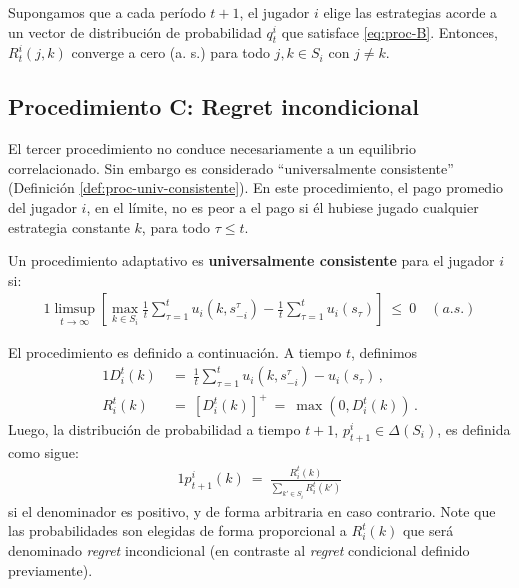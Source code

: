 \begin{theorem}
Supongamos que a cada período $t+1$, el jugador $i$ elige las estrategias acorde a un vector de distribución de probabilidad $q_t^i$ que satisface \eqref{eq:proc-B}. Entonces, $R^i_t(j, k)$ converge a cero (a. s.) para todo $j, k \in S_i$ con $j \neq k$.
\end{theorem}

\subsection*{Procedimiento C: Regret incondicional}

El tercer procedimiento no conduce necesariamente a un equilibrio correlacionado. Sin embargo es considerado ``universalmente consistente'' (Definición \ref{def:proc-univ-consistente}). En este procedimiento, el pago promedio del jugador $i$, en el límite, no es peor a el pago si él hubiese jugado cualquier estrategia constante $k$, para todo $\tau \leq t$.

\begin{definition}
\label{def:proc-univ-consistente}
Un procedimiento adaptativo es \textbf{universalmente consistente} para el jugador $i$ si:
\begin{alignat}{1}
	\limsup_{t \rightarrow \infty } \left[ \max_{k \in S_i} \frac{1}{t} \sum_{\tau = 1}^{t} u_i(k, s_{-i}^{\tau}) - \frac{1}{t} \sum_{\tau = 1}^{t} u_i(s_{\tau}) \right]\ \leq\ 0\quad (a. s.)
\end{alignat}
\end{definition}
El procedimiento es definido a continuación. A tiempo $t$, definimos
\begin{alignat}{1}
D_i^t(k)\ &=\ \frac{1}{t} \sum_{\tau = 1}^{t} u_i(k, s_{-i}^{\tau}) - u_i(s_{\tau}) \,, \\
R_i^t(k)\ &=\ [D_i^t(k)]^+\ =\ \max(0, D_i^t(k)) \,.
\end{alignat}
Luego, la distribución de probabilidad a tiempo $t+1$, $p_{t+1}^i \in \Delta(S_i)$, es definida como sigue:
\begin{alignat}{1}
\label{eq:proc-C}
  p_{t+1}^i(k)\ =\ \frac{R_i^t(k)}{\sum_{k'\in S_i} R_i^t(k')}
\end{alignat}
si el denominador es positivo, y de forma arbitraria en caso contrario. Note que las probabilidades son elegidas de forma proporcional a $R_i^t(k)$ que será denominado \textit{regret} incondicional (en contraste al \textit{regret} condicional definido previamente).


